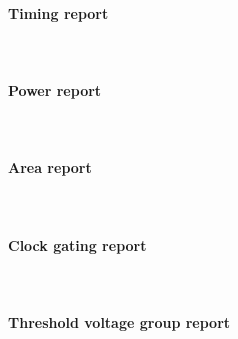 \paragraph{Timing report} \mbox{} \\

\paragraph{Power report} \mbox{} \\

\paragraph{Area report} \mbox{} \\

\paragraph{Clock gating report} \mbox{} \\

\paragraph{Threshold voltage group report} \mbox{} \\



